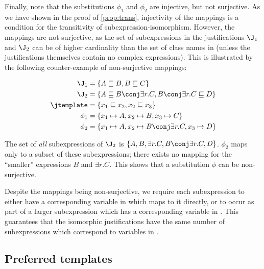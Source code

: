 Finally, note that the substitutions $\phi_{1}$ and $ \phi_{2}$ are injective, but not surjective. As we have shown in the proof of \ref{prop:trans}, injectivity of the mappings is a condition for the transitivity of subexpression-isomorphism. However, the mappings are not surjective, as the set of subexpressions in the justifications  $\J_{1}$ and $\J_{2}$ can be of higher cardinality  than the set of class names in \jtemplate (unless the justifications themselves contain no complex expressions). This is illustrated by the following counter-example of non-surjective mappings: 
\begin{examp}
\begin{align*}
\J_{1} &= \{A \sqsubseteq B, B \sqsubseteq C \}  \\ 
\J_{2}  &= \{ A \sqsubseteq B \conj \exists r.C, B \conj \exists r.C   \sqsubseteq D\}\\
\jtemplate &=  \{x_{1} \sqsubseteq x_{2}, x_{2} \sqsubseteq x_{3} \}  \\ 
\phi_{1} &= \{ x_{1} \mapsto A, x_{2} \mapsto B, x_{3} \mapsto C\}\\
\phi_{2} &= \{ x_{1} \mapsto A, x_{2} \mapsto B \conj \exists r.C, x_{3} \mapsto D\}
\end{align*}
\end{examp}

The set of \emph{all} subexpressions of $\J_{2}$ is $\{A, B, \exists r.C, B \conj \exists r.C, D\}$. $\phi_{2}$ maps only to a subset of these subexpressions; there exists no mapping for the \enquote{smaller} expressions $B$ and $\exists r.C$. This shows that a substitution $\phi$ can be non-surjective.

Despite the mappings being non-surjective, we require each subexpression to either have a corresponding variable in \jtemplate which maps to it directly, or to occur as part of a larger subexpression which has a corresponding variable in \J. This guarantees that the isomorphic justifications have the same number of subexpressions which correspond to variables in \J.


\subsection{Preferred templates}

